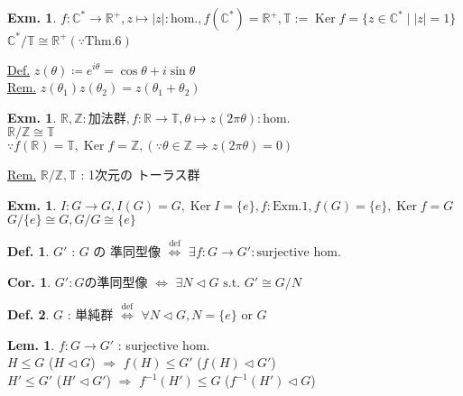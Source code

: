 \documentclass[uplatex,dvipdfmx,9pt]{beamer}
\newcommand{\defarrow}{\overset{\mathrm{def}}{\Leftrightarrow}}
\newcommand{\nsubgroup}{\vartriangleleft} %
\newcommand{\inverse}[1]{#1^{-1}}
\newcommand{\st}{\text{ s.t. }}
\newcommand{\Ker}{\operatorname{Ker}}
\newcounter{textThmCount}
\newcounter{textLemCount}
\newcounter{textExmCount}
\theoremstyle{definition} %
\newtheorem{defn}{Def.}[subsection] %
\newtheorem{corText}{Cor.}[textThmCount] %
\newtheorem{lemText}[textLemCount]{Lem.} %
\theoremstyle{example}
\newtheorem{exmText}[textExmCount]{Exm.}
\begin{document}
      \begin{frame}

        \begin{exmText}
          $f\colon \mathbb{C}^* \to \mathbb{R}^+, z \mapsto |z| : \text{hom.}, f(\mathbb{C}^*) = \mathbb{R}^+, \mathbb{T} := \Ker f = \{z \in \mathbb{C}^* \mid |z| = 1\}$ \\
          $\mathbb{C}^* / \mathbb{T} \cong \mathbb{R}^+ (\because \text{Thm.6})$
        \end{exmText}

        \underline{Def.} $z(\theta) \coloneqq e^{i\theta} = \cos \theta + i \sin \theta$ \\
        \underline{Rem.} $z(\theta_1)z(\theta_2) = z(\theta_1 + \theta_2)$
        \begin{exmText}
          $\mathbb{R}, \mathbb{Z} : \text{加法群}, f\colon \mathbb{R} \to \mathbb{T}, \theta \mapsto z(2\pi\theta) : \text{hom.}$ \\
          $\mathbb{R} / \mathbb{Z} \cong \mathbb{T}$ \\
          $\because f(\mathbb{R}) = \mathbb{T}, \Ker f = \mathbb{Z}, (\because \theta \in \mathbb{Z} \Rightarrow z(2\pi\theta) = 0)$
        \end{exmText}
        \underline{Rem.} $\mathbb{R}/\mathbb{Z}, \mathbb{T}$ : 1次元の \alert{トーラス群}

        \begin{exmText}
          $I\colon G \to G, I(G) = G, \Ker I = \{e\}, f : \text{Exm.1}, f(G) = \{e\}, \Ker f = G$ \\
          $G/\{e\} \cong G, G/G \cong \{e\}$
        \end{exmText}
        
      \end{frame}

      \begin{frame}

        \begin{defn}
          $G'$ : $G$ の \alert{準同型像} $\defarrow$ $\exists f\colon G \to G' : \text{surjective hom.}$
        \end{defn}

        \begin{corText}
          $G': G \text{の準同型像}$ $\Leftrightarrow$ $\exists N \nsubgroup G \st G' \cong G/N$
        \end{corText}

        \begin{defn}
          $G$ : \alert{単純群} $\defarrow$ $\forall N \nsubgroup G, N = \{e\}$ or $G$
        \end{defn}
        
        \begin{lemText}
          $f\colon G \to G'$ : surjective hom. \\
          $H \le G$ ($H \nsubgroup G$) $\Rightarrow$ $f(H) \le G'$ ($f(H) \nsubgroup G'$) \\
          $H' \le G'$ ($H' \nsubgroup G'$) $\Rightarrow$ $\inverse{f}(H') \le G$ ($\inverse{f}(H') \nsubgroup G$)
        \end{lemText}

      \end{frame}
\end{document}
